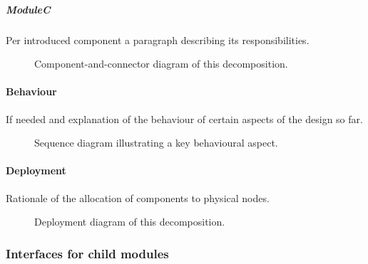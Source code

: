 \documentclass[a4paper,10pt]{article}
\begin{document}
\subparagraph{ModuleC}
Per introduced component a paragraph describing its responsibilities.

\begin{figure}[!htp]
    \centering
    \caption{Component-and-connector diagram of this decomposition.
        }\label{fig:it1-cc_main}
\end{figure}

\paragraph{Behaviour}
If needed and explanation of the behaviour of certain aspects of the design so
far.

\begin{figure}[!htp]
    \centering
    \caption{Sequence diagram illustrating a key behavioural aspect.
        }\label{fig:it1-seq_aspect1}
\end{figure}

\paragraph{Deployment}
Rationale of the allocation of components to physical nodes.

\begin{figure}[!htp]
    \centering
    \caption{Deployment diagram of this decomposition.
        }\label{fig:it1-depl_main}
\end{figure}

\subsubsection{Interfaces for child modules}
\end{document}
